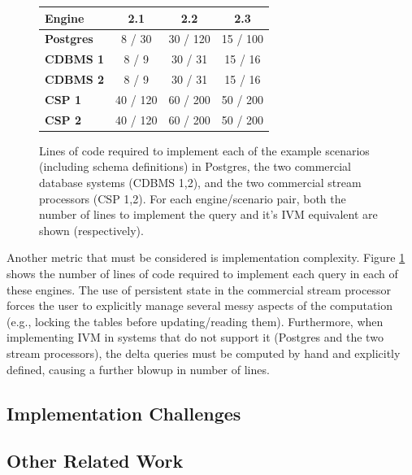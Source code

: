\begin{figure}
\begin{center}
\begin{tabular}{|l|c|c|c|}
\hline
{\bf Engine}   & {\bf 2.1} & {\bf 2.2} & {\bf 2.3} \\\hline
{\bf Postgres} & 8 / 30    & 30 / 120  & 15 / 100 \\\hline
{\bf CDBMS 1}  & 8 / 9     & 30 / 31   & 15 / 16  \\\hline
{\bf CDBMS 2}  & 8 / 9     & 30 / 31   & 15 / 16  \\\hline
{\bf CSP 1}    & 40 / 120  & 60 / 200  & 50 / 200 \\\hline
{\bf CSP 2}    & 40 / 120  & 60 / 200  & 50 / 200 \\\hline
\end{tabular}

\end{center}
\label{fig:dbfail:locBakeoff}
\caption{Lines of code required to implement each of the example scenarios (including schema definitions) in Postgres, the two commercial database systems (CDBMS 1,2), and the two commercial stream processors (CSP 1,2).  For each engine/scenario pair, both the number of lines to implement the query and it's IVM equivalent are shown (respectively).}
\end{figure}

Another metric that must be considered is implementation complexity.  Figure \ref{fig:dbfail:locBakeoff} shows the number of lines of code required to implement each query in each of these engines.  The use of persistent state in the commercial stream processor forces the user to explicitly manage several messy aspects of the computation (e.g., locking the tables before updating/reading them).  Furthermore, when implementing IVM in systems that do not support it (Postgres and the two stream processors), the delta queries must be computed by hand and explicitly defined, causing a further blowup in number of lines.

\subsection{Implementation Challenges}

\subsection{Other Related Work}